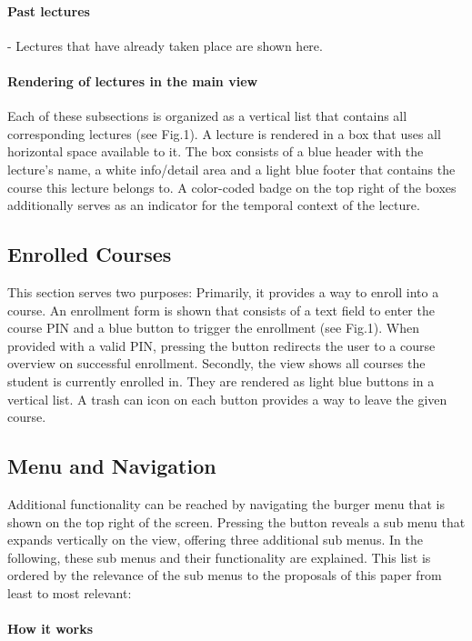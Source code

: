 \paragraph{Past lectures} - Lectures that have already taken place are shown here.


\paragraph{Rendering of lectures in the main view}

Each of these subsections is organized as a vertical list that contains all corresponding lectures (see Fig.1). A lecture is rendered in a box that uses all horizontal space available to it. The box consists of a blue header with the lecture's name, a white info/detail area and a light blue footer that contains the course this lecture belongs to.
A color-coded badge on the top right of the boxes additionally serves as an indicator for the temporal context of the lecture.

\subsection{Enrolled Courses}

This section serves two purposes: Primarily, it provides a way to enroll into a course. An enrollment form is shown that consists of a text field to enter the course PIN and a blue button to trigger the enrollment (see Fig.1). When provided with a valid PIN, pressing the button redirects the user to a course overview on successful enrollment.
Secondly, the view shows all courses the student is currently enrolled in. They are rendered as light blue buttons in a vertical list. A trash can icon on each button provides a way to leave the given course.


\subsection{Menu and Navigation}
Additional functionality can be reached by navigating the burger menu that is shown on the top right of the screen. Pressing the button reveals a sub menu that expands vertically on the view, offering three additional sub menus. In the following, these sub menus and their functionality are explained. This list is ordered by the relevance of the sub menus to the proposals of this paper from least to most relevant:

\paragraph{How it works}

